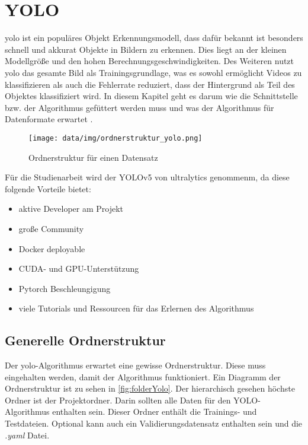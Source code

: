 \chapter{YOLO}
\label{sec:yolo}
\ac{yolo} ist ein populäres Objekt Erkennungsmodell, dass dafür bekannt ist besonders schnell und akkurat Objekte in Bildern zu erkennen. Dies liegt an der kleinen Modellgröße und den hohen Berechnungsgeschwindigkeiten. Des Weiteren nutzt \ac{yolo} das gesamte Bild als Trainingsgrundlage, was es sowohl ermöglicht Videos zu klassifizieren als auch die Fehlerrate reduziert, dass der Hintergrund als Teil des Objektes klassifiziert wird. In diesem Kapitel geht es darum wie die Schnittstelle bzw. der Algorithmus gefüttert werden muss und was der Algorithmus für Datenformate erwartet \cite{Jiang.2022}.

\begin{wrapfigure}{r}{5cm}
    \texttt{[image: data/img/ordnerstruktur\_yolo.png]}
    \caption{Ordnerstruktur für einen Datensatz}
    \label{fig:folderYolo}
\end{wrapfigure}

Für die Studienarbeit wird der YOLOv5 von ultralytics \cite{glennjocher.2023} genommenm, da diese folgende Vorteile bietet:
\begin{itemize}
    \item aktive Developer am Projekt
    \item große Community 
    \item Docker deployable
    \item CUDA- und GPU-Unterstützung
    \item Pytorch Beschleungigung
    \item viele Tutorials und Ressourcen für das Erlernen des Algorithmus
\end{itemize}


\section{Generelle Ordnerstruktur}
\label{sec:yolo_folderstructure}
Der \ac{yolo}-Algorithmus erwartet eine gewisse Ordnerstruktur. Diese muss eingehalten werden, damit der Algorithmus funktioniert. Ein Diagramm der Ordnerstruktur ist zu sehen in \autoref{fig:folderYolo}. Der hierarchisch gesehen höchste Ordner ist der Projektordner. Darin sollten alle Daten für den YOLO-Algorithmus enthalten sein. Dieser Ordner enthält die Trainings- und Testdateien. Optional kann auch ein Validierungsdatensatz enthalten sein und die \textit{.yaml} Datei.

